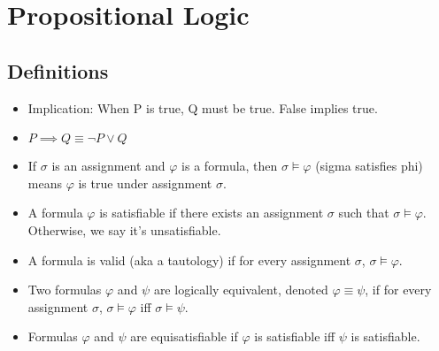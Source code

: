 \documentclass{article}
\begin{document}
\section*{Propositional Logic}
\subsection{Definitions}

\begin{itemize}
\item Implication: When P is true, Q must be true. False implies true.
\item $P \implies Q \equiv \neg P \lor Q$
\item If $\sigma$ is an assignment and $\varphi$ is a formula, then $\sigma \models \varphi$ (sigma satisfies phi) means $\varphi$ is true under assignment $\sigma$.
\item A formula $\varphi$ is satisfiable if there exists an assignment $\sigma$ such that $\sigma \models \varphi$. Otherwise, we say it's unsatisfiable.
\item A formula is valid (aka a tautology) if for every assignment $\sigma$, $\sigma \models \varphi$.
\item Two formulas $\varphi$ and $\psi$ are logically equivalent, denoted $\varphi \equiv \psi$, if for every assignment $\sigma$, $\sigma \models \varphi$ iff $\sigma \models \psi$.
\item Formulas $\varphi$ and $\psi$ are equisatisfiable if $\varphi$ is satisfiable iff $\psi$ is satisfiable.
\end{itemize}
\end{document}
